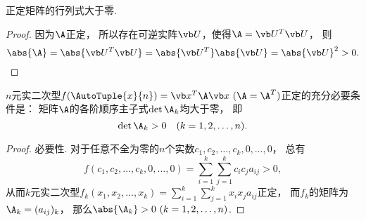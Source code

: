 \begin{corollary}
正定矩阵的行列式大于零.
\begin{proof}
因为\(\A\)正定，
所以存在可逆实阵\(\P\)，使得\(\A=\P^T\P\)，
则\[
	\abs{\A}
	=\abs{\P^T\P}
	=\abs{\P^T} \abs{\P\vphantom{\P^T}}
	=\abs{\P}^2>0.
	\qedhere
\]
\end{proof}
\end{corollary}

\begin{theorem}
\(n\)元实二次型\(f(\AutoTuple{x}{n}) = \x^T\A\x\ (\A=\A^T)\)正定的充分必要条件是：
矩阵\(\A\)的各阶顺序主子式\(\det\A_k\)均大于零，
即\[
	\det\A_k > 0
	\quad(k=1,2,\dotsc,n).
\]
\begin{proof}
必要性.
对于任意不全为零的\(n\)个实数\(c_1,c_2,\dotsc,c_k,0,\dotsc,0\)，
总有\[
	f(c_1,c_2,\dotsc,c_k,0,\dotsc,0)
	= \sum_{i=1}^k \sum_{j=1}^k c_i c_j a_{ij} > 0,
\]
从而\(k\)元实二次型\(f_k(x_1,x_2,\dotsc,x_k)
=\sum_{i=1}^k
\sum_{j=1}^k
x_i x_j a_{ij}\)正定，
而\(f_k\)的矩阵为\(\A_k = (a_{ij})_k\)，
那么\(\abs{\A_k} > 0\ (k=1,2,\dotsc,n)\).


\end{proof}
\end{theorem}
